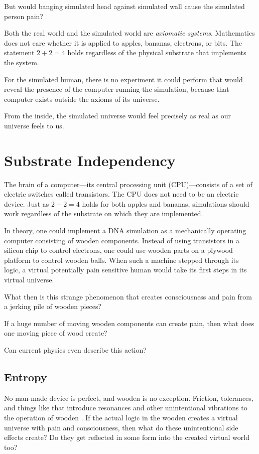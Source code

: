 But would banging simulated head against simulated wall cause the simulated person pain? 

Both the real world and the simulated world are \emph{axiomatic systems}. Mathematics does 
not care whether it is applied to apples, bananas, electrons, or bits. The statement $2 + 2 = 4$ holds 
regardless of the physical substrate that implements the system.

For the simulated human, there is no experiment it could perform that would reveal the presence of the computer 
running the simulation, because that computer exists outside the axioms of its universe.

From the inside, the simulated universe would feel precisely as real as our universe feels to us.


\section*{Substrate Independency}

The brain of a computer---its central processing unit (CPU)---consists of a set of electric switches called transistors. The CPU does not need to be an electric device.
Just as $2+2=4$ holds for both apples and bananas, simulations should work regardless of the substrate on which they are implemented.

In theory, one could implement a DNA simulation as a mechanically operating computer consisting of wooden components. Instead of using transistors in a silicon chip to control electrons, one could use wooden parts on a plywood platform to control wooden balls. When such a machine stepped through its logic, a virtual potentially pain sensitive
human would take its first steps in its virtual universe.

What then is this strange phenomenon that creates consciousness and pain from a jerking pile of wooden pieces?

If a huge number of moving wooden components can create pain, then what does one moving piece of wood create?

Can current physics even describe this action?

\subsection*{Entropy}

No man-made device is perfect, and wooden \texttrademark{} is no exception. Friction, tolerances, and things like that introduce resonances and other unintentional vibrations to the operation of wooden \texttrademark{}.
If the actual logic in the wooden \texttrademark{} creates a virtual universe with pain and consciousness, then what do these unintentional side effects create? Do they get reflected in some form into the created virtual world too?

